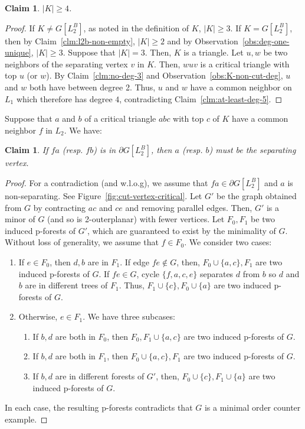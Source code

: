 \documentclass[11pt]{article}
\newtheorem{claim}[theorem]{Claim}
\begin{document}
\begin{claim} \label{clm:K-non-triangular}
$|K| \geq 4$.
\end{claim}
\begin{proof}
If $K \not= G[L_2^B]$, as noted in the definition of $K$, $|K| \geq 3$. If $K = G[L_2^B]$, then by Claim~\ref{clm:l2b-non-empty}, $|K| \geq 2$ and by Observation~\ref{obs:deg-one-unique}, $|K| \geq 3$. Suppose that $|K| = 3$. Then, $K$ is a triangle. Let $u,w$ be two neighbors of the separating vertex $v$ in $K$. Then, $wuv$ is a critical triangle with top $u$ (or $w$). By Claim~\ref{clm:no-deg-3} and Observation~\ref{obs:K-non-cut-deg}, $u$ and $w$ both have between degree 2. Thus, $u$ and $w$ have a common neighbor on $L_1$ which therefore has degree $4$, contradicting Claim~\ref{clm:at-least-deg-5}. 
\end{proof}

Suppose that $a$ and $b$ of a critical triangle $abc$ with top $c$ of $K$ have a common neighbor $f$ in $L_2$. We have: 

\begin{claim} \label{clm:b-cut-vertex}
If $fa$ (resp. $fb$) is in $\partial G[L_2^B]$, then $a$ (resp. $b$) must be the separating vertex. 
\end{claim}
\begin{proof}
For a contradiction (and w.l.o.g), we assume that $fa \in \partial G[L_2^B]$ and $a$ is  non-separating. See Figure~\ref{fig:cut-vertex-critical}. Let $G'$ be the graph obtained from $G$ by contracting $ac$ and $ce$ and removing parallel edges. Then, $G'$ is a minor of $G$ (and so is 2-outerplanar) with fewer vertices. Let $F_0,F_1$ be two induced p-forests of $G'$, which are guaranteed to exist by the minimality of $G$.  Without loss of generality, we assume that $f\in F_0$. We consider two cases:
\begin{enumerate}
\item If $e \in F_0$, then $d,b$ are in $F_1$. If edge $fe \not\in G$, then, $F_0 \cup \{a,c\}, F_1$ are two induced p-forests of $G$. If $fe \in G$, cycle $\{f,a,c,e\}$ separates $d$ from $b$ so $d$ and $b$ are in different trees of $F_1$. Thus, $F_1 \cup \{c\}, F_0 \cup \{a\}$ are two induced p-forests of $G$. 
\item Otherwise, $e \in F_1$. We have three subcases:
	\begin{enumerate}
		\item If $b,d$ are both in $F_0$, then $F_0, F_1 \cup \{a,c\}$ are two induced p-forests of $G$.
		\item If $b,d$ are both in $F_1$, then $F_0 \cup \{a,c\}, F_1$ are two induced p-forests of $G$.
		\item If $b,d$ are in different forests of $G'$, then, $F_0 \cup \{c\}, F_1 \cup \{a\}$ are two induced p-forests of $G$.
	\end{enumerate}
\end{enumerate}
In each case, the resulting p-forests contradicts that $G$ is a minimal order counter example. 
\end{proof}
\end{document}
